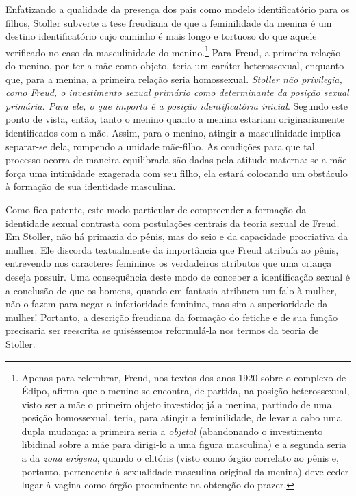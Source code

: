 Enfatizando a qualidade da presença dos pais como modelo identificatório
para os filhos, Stoller subverte a tese freudiana de que a feminilidade
da menina é um destino identificatório cujo caminho é mais longo e
tortuoso do que aquele verificado no caso da masculinidade do
menino.\footnote{Apenas para relembrar, Freud, nos textos dos anos 1920
  sobre o complexo de Édipo, afirma que o menino se encontra, de
  partida, na posição heterossexual, visto ser a mãe o primeiro objeto
  investido; já a menina, partindo de uma posição homossexual, teria,
  para atingir a feminilidade, de levar a cabo uma dupla mudança: a
  primeira seria a \emph{objetal} (abandonando o investimento libidinal
  sobre a mãe para dirigi-lo a uma figura masculina) e a segunda seria a
  da \emph{zona erógena}, quando o clitóris (visto como órgão correlato
  ao pênis e, portanto, pertencente à sexualidade masculina original da
  menina) deve ceder lugar à vagina como órgão proeminente na obtenção
  do prazer.} Para Freud, a primeira relação do menino, por ter a mãe
como objeto, teria um caráter heterossexual, enquanto que, para a
menina, a primeira relação seria homossexual. \emph{Stoller não
privilegia, como Freud, o investimento sexual primário como determinante
da posição sexual primária. Para ele, o que importa é a posição
identificatória inicial}. Segundo este ponto de vista, então, tanto o
menino quanto a menina estariam originariamente identificados com a mãe.
Assim, para o menino, atingir a masculinidade implica separar-se dela,
rompendo a unidade mãe-filho. As condições para que tal processo ocorra
de maneira equilibrada são dadas pela atitude materna: se a mãe força
uma intimidade exagerada com seu filho, ela estará colocando um
obstáculo à formação de sua identidade masculina.

Como fica patente, este modo particular de compreender a formação da
identidade sexual contrasta com postulações centrais da teoria sexual de
Freud. Em Stoller, não há primazia do pênis, mas do seio e da capacidade
procriativa da mulher. Ele discorda textualmente da importância que
Freud atribuía ao pênis, entrevendo nos caracteres femininos os
verdadeiros atributos que uma criança deseja possuir. Uma consequência
deste modo de conceber a identificação sexual é a conclusão de que os
homens, quando em fantasia atribuem um falo à mulher, não o fazem para
negar a inferioridade feminina, mas sim a superioridade da mulher!
Portanto, a descrição freudiana da formação do fetiche e de sua função
precisaria ser reescrita se quiséssemos reformulá-la nos termos da
teoria de Stoller.


